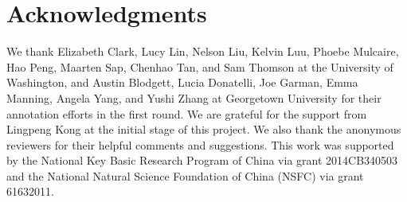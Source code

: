 \documentclass[11pt,a4paper]{article}
\begin{document}
\section*{Acknowledgments}
We thank Elizabeth Clark, Lucy Lin, Nelson Liu, Kelvin Luu, Phoebe Mulcaire, 
Hao Peng, Maarten Sap, Chenhao Tan, and Sam Thomson at the University of Washington, 
and Austin Blodgett, Lucia Donatelli, Joe Garman, Emma Manning, Angela Yang, and Yushi Zhang 
at Georgetown University for their annotation efforts in the first round.
We are grateful for the support from Lingpeng Kong at the initial stage of this project.
We also thank the anonymous reviewers for their helpful comments and suggestions.
This work was supported by the National Key Basic Research
Program of China via grant 2014CB340503 and the
National Natural Science Foundation of China (NSFC) via
grant 61632011.
\end{document}
